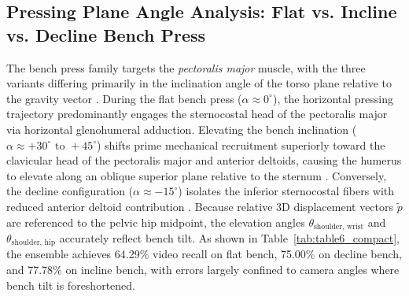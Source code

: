 \documentclass[runningheads]{llncs}
\begin{document}
\subsection{Pressing Plane Angle Analysis: Flat vs. Incline vs. Decline Bench Press}
The bench press family targets the \textit{pectoralis major} muscle, with the three variants differing primarily in the inclination angle of the torso plane relative to the gravity vector \cite{barnett1995,trebs2010}. During the flat bench press ($\alpha \approx 0^\circ$), the horizontal pressing trajectory predominantly engages the sternocostal head of the pectoralis major via horizontal glenohumeral adduction. Elevating the bench inclination ($\alpha \approx +30^\circ \text{ to } +45^\circ$) shifts prime mechanical recruitment superiorly toward the clavicular head of the pectoralis major and anterior deltoids, causing the humerus to elevate along an oblique superior plane relative to the sternum \cite{trebs2010}. Conversely, the decline configuration ($\alpha \approx -15^\circ$) isolates the inferior sternocostal fibers with reduced anterior deltoid contribution \cite{barnett1995}. Because relative 3D displacement vectors $\tilde{p}$ are referenced to the pelvic hip midpoint, the elevation angles $\theta_{\text{shoulder, wrist}}$ and $\theta_{\text{shoulder, hip}}$ accurately reflect bench tilt. As shown in Table~\ref{tab:table6_compact}, the ensemble achieves 64.29\% video recall on flat bench, 75.00\% on decline bench, and 77.78\% on incline bench, with errors largely confined to camera angles where bench tilt is foreshortened.
\end{document}
